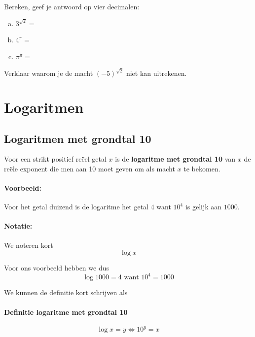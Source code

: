 \documentclass[12pt,twoside]{article}
\begin{document}
\begin{oefening}
Bereken, geef je antwoord op vier decimalen:\\
\begin{enumerate}[(a)]
  \itemsep1.5em
  \item $3^{\sqrt{2}}=$\arulefill
  \item $4^\pi=$\arulefill
  \item $\pi^\pi=$\arulefill
\end{enumerate}
\end{oefening}

\begin{oefening}
Verklaar waarom je  de macht $(-5)^{\sqrt{2}}$ niet kan uitrekenen.
\end{oefening}

\pagebreak

\section{Logaritmen}

\subsection{Logaritmen met grondtal 10}

Voor een strikt positief reëel getal $x$ is de {\bf logaritme met grondtal 10} van $x$ de reële exponent die men aan 10 moet geven om als macht $x$ te bekomen.

\paragraph*{Voorbeeld:} Voor het getal duizend is de logaritme het getal $4$ want $10^4$ is gelijk aan $1000$.

\paragraph*{Notatie:} We noteren kort
$$\log x$$

Voor ons voorbeeld hebben we dus
$$\log 1000 = 4 \mbox{ want } 10^4 = 1000$$

We kunnen de definitie kort schrijven als

\paragraph*{Definitie logaritme met grondtal 10}
\begin{mdframed}
$$\log x = y \Leftrightarrow 10^y = x$$
\end{mdframed}
\end{document}
